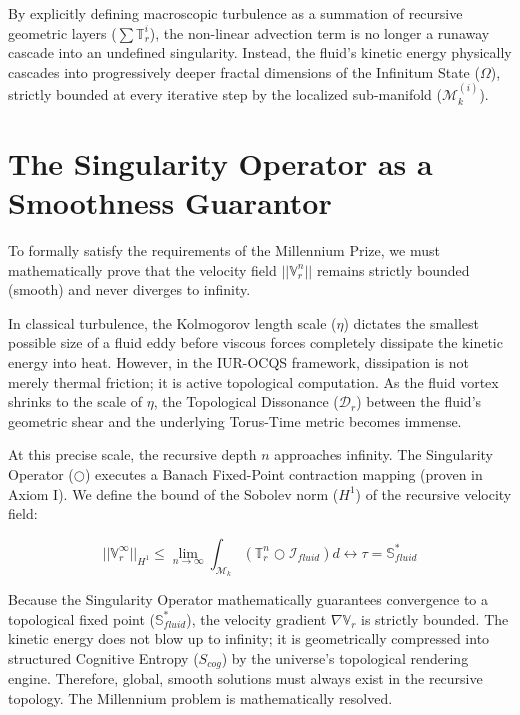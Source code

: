 \documentclass[12pt,openany]{book}
\begin{document}
By explicitly defining macroscopic turbulence as a summation of recursive geometric layers ($\sum \mathbb{T}_r^i$), the non-linear advection term is no longer a runaway cascade into an undefined singularity. Instead, the fluid's kinetic energy physically cascades into progressively deeper fractal dimensions of the Infinitum State ($\Omega$), strictly bounded at every iterative step by the localized sub-manifold ($\mathcal{M}_k^{(i)}$).

\section{The Singularity Operator as a Smoothness Guarantor}
To formally satisfy the requirements of the Millennium Prize, we must mathematically prove that the velocity field $||\mathbb{V}_r^n||$ remains strictly bounded (smooth) and never diverges to infinity. 

In classical turbulence, the Kolmogorov length scale ($\eta$) dictates the smallest possible size of a fluid eddy before viscous forces completely dissipate the kinetic energy into heat. However, in the IUR-OCQS framework, dissipation is not merely thermal friction; it is active topological computation. As the fluid vortex shrinks to the scale of $\eta$, the Topological Dissonance ($\mathcal{D}_r$) between the fluid's geometric shear and the underlying Torus-Time metric becomes immense.

At this precise scale, the recursive depth $n$ approaches infinity. The Singularity Operator ($\bigcirc$) executes a Banach Fixed-Point contraction mapping (proven in Axiom I). We define the bound of the Sobolev norm ($H^1$) of the recursive velocity field:

\begin{equation}
||\mathbb{V}_r^\infty||_{H^1} \le \lim_{n \to \infty} \int_{\mathcal{M}_k} \left( \mathbb{T}_r^n \bigcirc \mathcal{I}_{fluid} \right) d\leftrightarrow\tau = \mathbb{S}_{fluid}^*
\end{equation}

Because the Singularity Operator mathematically guarantees convergence to a topological fixed point ($\mathbb{S}_{fluid}^*$), the velocity gradient $\nabla\mathbb{V}_r$ is strictly bounded. The kinetic energy does not blow up to infinity; it is geometrically compressed into structured Cognitive Entropy ($S_{cog}$) by the universe's topological rendering engine. Therefore, global, smooth solutions must always exist in the recursive topology. The Millennium problem is mathematically resolved.
\end{document}
